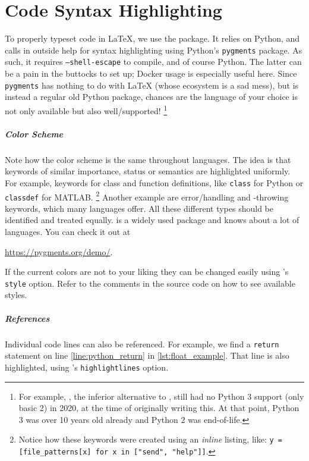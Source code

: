 \chapter{Code Syntax Highlighting}
\label{ch:code-listings}

To properly typeset code in \LaTeX{}, we use the  package.
It relies on Python, and calls in outside help for syntax highlighting using Python's
\texttt{pygments} package.
As such, it requires \texttt{--shell-escape} to compile, and of course Python.
The latter can be a pain in the buttocks to set up; Docker usage is especially useful here.
Since \texttt{pygments} has nothing to do with \LaTeX{} (whose ecosystem is a sad mess),
but is instead a regular old Python package, chances are the language of your choice is
not only available but also well\-/supported!%
\footnote{%
    For example, , the inferior alternative to ,
    still had no Python 3 support (only basic 2) in 2020, at the time of originally writing this.
    At that point, Python 3 was over 10 years old already and Python 2 was end-of-life.
}

\paragraph{Color Scheme}
Note how the color scheme is the same throughout languages.
The idea is that keywords of similar importance, status or semantics are highlighted uniformly.
For example, keywords for class and function definitions, like \texttt{class}
for Python or \texttt{classdef} for MATLAB.%
\footnote{%
    Notice how these keywords were created using an \emph{inline} listing, like:
    \texttt{y = [file_patterns[x] for x in ["send", "help"]]}.
}
Another example are error\-/handling and -throwing keywords, which many languages
offer.
All these different types should be identified and treated equally.
 is a widely used package and knows about a lot of languages.
You can check it out at
\begin{center}
    \url{https://pygments.org/demo/}.
\end{center}

If the current colors are not to your liking they can be changed easily using
's \texttt{style} option.
Refer to the comments in the source code on how to see available styles.

\paragraph{References}
Individual code lines can also be referenced.
For example, we find a \texttt{return} statement on
line \ref{line:python_return} in \cref{lst:float_example}.
That line is also highlighted, using 's \texttt{highlightlines} option.

